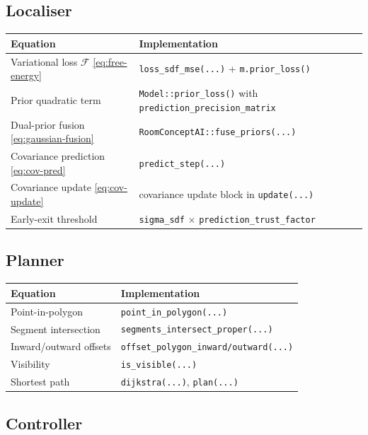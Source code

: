 \documentclass[a4paper, 11pt]{article}
\begin{document}
\subsection{Localiser}

\begin{center}
\small
\begin{tabular}{p{7cm}p{7cm}}
  \toprule
  Equation & Implementation \\
  \midrule
  Variational loss $\mathcal{F}$ \eqref{eq:free-energy}
    & \texttt{loss\_sdf\_mse(...)} + \texttt{m.prior\_loss()} \\
  Prior quadratic term
    & \texttt{Model::prior\_loss()} with \texttt{prediction\_precision\_matrix} \\
  Dual-prior fusion \eqref{eq:gaussian-fusion}
    & \texttt{RoomConceptAI::fuse\_priors(...)} \\
  Covariance prediction \eqref{eq:cov-pred}
    & \texttt{predict\_step(...)} \\
  Covariance update \eqref{eq:cov-update}
    & covariance update block in \texttt{update(...)} \\
  Early-exit threshold
    & \texttt{sigma\_sdf} $\times$ \texttt{prediction\_trust\_factor} \\
  \bottomrule
\end{tabular}
\end{center}

\subsection{Planner}

\begin{center}
\small
\begin{tabular}{p{7cm}p{7cm}}
  \toprule
  Equation & Implementation \\
  \midrule
  Point-in-polygon   & \texttt{point\_in\_polygon(...)} \\
  Segment intersection & \texttt{segments\_intersect\_proper(...)} \\
  Inward/outward offsets & \texttt{offset\_polygon\_inward/outward(...)} \\
  Visibility          & \texttt{is\_visible(...)} \\
  Shortest path       & \texttt{dijkstra(...)}, \texttt{plan(...)} \\
  \bottomrule
\end{tabular}
\end{center}

\subsection{Controller}
\end{document}
